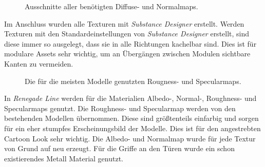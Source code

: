 \begin{figure}[H]
   \qquad
  \caption{Ausschnitte aller benötigten Diffuse- und Normalmaps.}%
\label{Textures}
\end{figure}
\vspace{-10.5pt}
Im Anschluss wurden alle Texturen mit \textit{Substance Designer} erstellt. Werden Texturen mit den Standardeinstellungen von \textit{Substance Designer} erstellt, sind diese immer so ausgelegt, dass sie in alle Richtungen kachelbar sind. Dies ist für modulare Assets sehr wichtig, um an Übergängen zwischen Modulen sichtbare Kanten zu vermeiden.
\begin{figure}[H]
\centering
  \qquad
  \caption{Die für die meisten Modelle genutzten Rougness- und Specularmaps.}%
\label{altemaps}
\end{figure}
\vspace{-10.5pt}
In \textit{Renegade Line} werden für die Materialien Albedo-, Normal-, Roughness- und Specularmaps genutzt. Die Roughness- und Specularmap werden von den bestehenden Modellen übernommen. Diese sind größtenteils einfarbig und sorgen für ein eher stumpfes Erscheinungsbild der Modelle. Dies ist für den angestrebten Cartoon Look sehr wichtig. Die Albedo- und Normalmap wurde für jede Textur von Grund auf neu erzeugt. Für die Griffe an den Türen wurde ein schon existierendes Metall Material genutzt.
